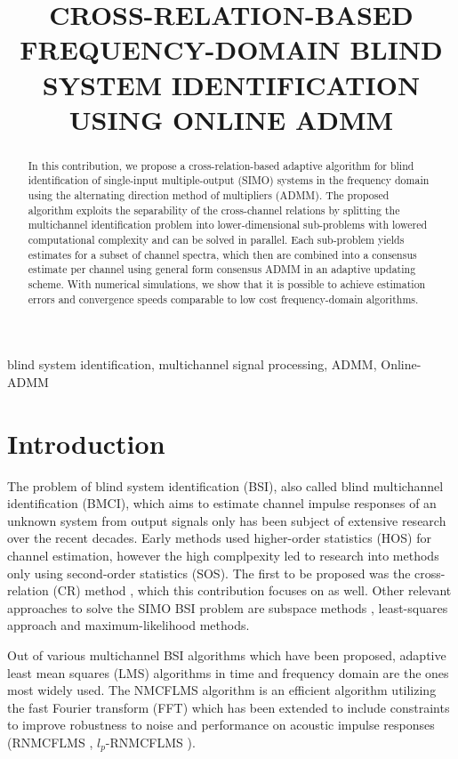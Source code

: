 \documentclass{article}
\title{CROSS-RELATION-BASED FREQUENCY-DOMAIN BLIND SYSTEM IDENTIFICATION USING ONLINE ADMM}
\begin{document}
%
\maketitle
%
\begin{abstract}
    In this contribution, we propose a cross-relation-based adaptive algorithm for blind identification of single-input multiple-output (SIMO) systems in the frequency domain using the alternating direction method of multipliers (ADMM).
    The proposed algorithm exploits the separability of the cross-channel relations by splitting the multichannel identification problem into lower-dimensional sub-problems with lowered computational complexity and can be solved in parallel.
    Each sub-problem yields estimates for a subset of channel spectra, which then are combined into a consensus estimate per channel using general form consensus ADMM in an adaptive updating scheme.
    With numerical simulations, we show that it is possible to achieve estimation errors and convergence speeds comparable to low cost frequency-domain algorithms.
\end{abstract}
%
\begin{keywords}
    blind system identification, multichannel signal processing, ADMM, Online-ADMM
\end{keywords}
%
\section{Introduction}
\label{sec:intro}
The problem of blind system identification (BSI), also called blind multichannel identification (BMCI), which aims to estimate channel impulse responses of an unknown system from output signals only has been subject of extensive research over the recent decades.
Early methods used higher-order statistics (HOS) \cite{} for channel estimation, however the high complpexity led to research into methods only using second-order statistics (SOS).
The first to be proposed was the cross-relation (CR) method \cite{}, which this contribution focuses on as well.
Other relevant approaches to solve the SIMO BSI problem are subspace methods \cite{}, least-squares approach \cite{} and maximum-likelihood \cite{} methods.

Out of various multichannel BSI algorithms which have been proposed, adaptive least mean squares (LMS) algorithms in time \cite{} and frequency domain \cite{} are the ones most widely used.
The NMCFLMS algorithm is an efficient algorithm utilizing the fast Fourier transform (FFT) which has been extended to include constraints to improve robustness to noise and performance on acoustic impulse responses (RNMCFLMS \cite{}, \(l_p\)-RNMCFLMS \cite{}).
\end{document}
